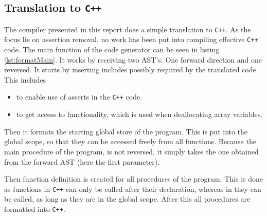 \subsection{Translation to \texttt{C++} \rr}
The \lan compiler presented in this report does a simple translation to \texttt{C++}.
As the focus lie on assertion removal, no work has been put into compiling effective
\texttt{C++} code. The main function of the code generator can be seen in listing
\ref{lst:formatMain}. It works by receiving two AST's: One forward direction and one reversed.
It starts by inserting includes possibly required by the translated code. This includes

\begin{itemize}
      \item {} to enable use of asserts in the \texttt{C++} code.

      \item {} to get access to  functionality, which is used
            when deallocating array variables.
\end{itemize}
\noindent
Then it formats the starting global store of the \lan program. This is put into the global
scope, so that they can be accessed freely from all functions. Because the main procedure of
the \lan program, is not reversed, it simply takes the one obtained from the forward AST
(here the first parameter).

Then function definition is created for all procedures of the program. This is done as
functions in \texttt{C++} can only be called after their declaration, whereas in \lan
they can be called, as long as they are in the global scope.
After this all procedures are formatted into \texttt{C++}.

